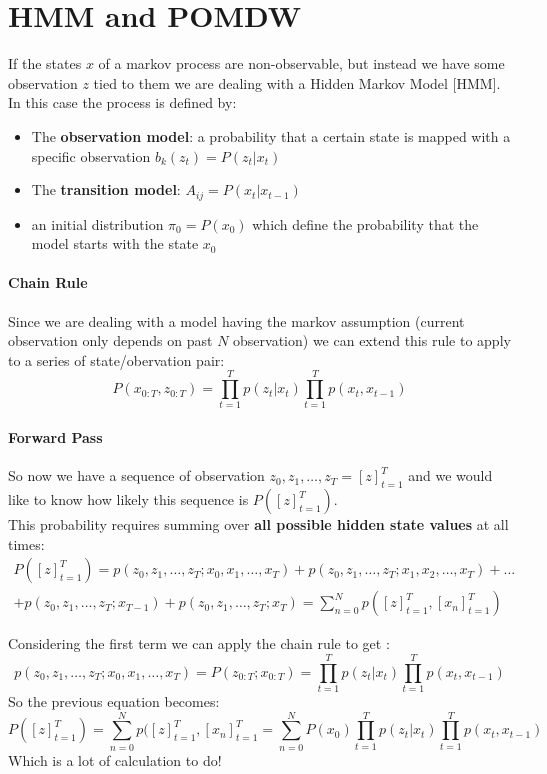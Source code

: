 \section{HMM and POMDW}
If the states $x$ of a markov process are non-observable, but instead we have some observation $z$ tied to them we are dealing with a Hidden Markov Model [HMM].\\
In this case the process is defined by:
\begin{itemize}
\item The \textbf{observation model}: a probability that a certain state is mapped with a specific observation $b_k(z_t)=P(z_t|x_t)$ 
\item The \textbf{transition model}: $A_{ij}=P(x_t|x_{t-1})$
\item an initial distribution $\pi_0=P(x_0)$ which define the probability that the model starts with the state $x_0$
\end{itemize}

\paragraph{Chain Rule}
Since we are dealing with a model having the markov assumption (current observation only depends on past $N$ observation) we can extend this rule to apply to a series of state/obervation pair:
$$ P(x_{0:T},z_{0:T})=\prod_{t=1}^Tp(z_t|x_t) \prod_{t=1}^Tp(x_t,x_{t-1})$$

\paragraph{Forward Pass}
So now we have a sequence of observation $z_0,z_1,\dots,z_T=[z]_{t=1}^T$ and we would like to know how likely this sequence is $P([z]_{t=1}^T)$.\\
This probability  requires summing over \textbf{all possible hidden state values} at all times:
\begin{equation}
\begin{aligned}
P([z]_{t=1}^T)=p(z_0,z_1,\dots, z_T; x_0,x_1,\dots,x_T)+p(z_0,z_1,\dots, z_T; x_1,x_2,\dots,x_T)+\dots\\
+p(z_0,z_1,\dots, z_T; x_{T-1})+p(z_0,z_1,\dots, z_T; x_T)=\sum_{n=0}^Np([z]_{t=1}^T,[x_n]_{t=1}^T)
\end{aligned}
\end{equation}

Considering the first term we can apply the chain rule to get :
$$p(z_0,z_1,\dots, z_T; x_0,x_1,\dots,x_T)=P(z_{0:T};x_{0:T})=\prod_{t=1}^Tp(z_t|x_t) \prod_{t=1}^Tp(x_t,x_{t-1})$$
So the previous equation becomes:
 $$P([z]_{t=1}^T)=\sum_{n=0}^Np([z]_{t=1}^T,[x_n]_{t=1}^T=\sum_{n=0}^N P(x_0)\prod_{t=1}^Tp(z_t|x_t) \prod_{t=1}^Tp(x_t,x_{t-1})$$
 Which is a lot of calculation to do!\\
 
